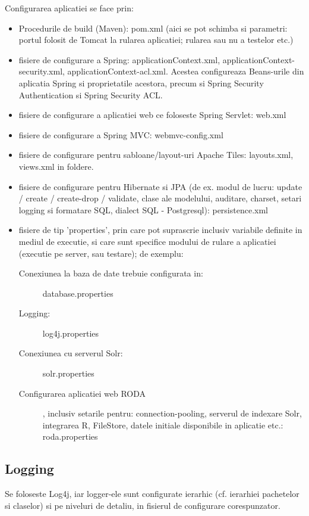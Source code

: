 Configurarea aplicatiei se face prin:
\begin {itemize}
\item Procedurile de build (Maven):
pom.xml
(aici se pot schimba si parametri: portul folosit de Tomcat la rularea aplicatiei; rularea sau nu a testelor etc.)
\item
fisiere de configurare a Spring: applicationContext.xml,
applicationContext-security.xml, applicationContext-acl.xml. 
Acestea configureaza Beans-urile din aplicatia Spring si proprietatile acestora, precum si Spring Security Authentication si Spring Security ACL.
\item
fisiere de configurare a aplicatiei web ce foloseste Spring Servlet:
web.xml
\item
fisiere de configurare a Spring MVC: 
webmvc-config.xml
\item
fisiere de configurare pentru sabloane/layout-uri Apache Tiles: 
layouts.xml, views.xml in foldere.
\item 
fisiere de configurare pentru Hibernate si JPA (de ex. modul de lucru: update / create / create-drop /
validate, clase ale modelului, auditare, charset, setari logging si formatare SQL, dialect SQL - Postgresql):
persistence.xml
\item
fisiere de tip 'properties', prin care pot suprascrie
inclusiv variabile definite in mediul de executie, si care sunt specifice modului de rulare a
aplicatiei (executie pe server, sau testare); de exemplu: 
\begin{description}
\item[Conexiunea la baza de date trebuie configurata in:]
database.properties
\item[Logging:]
log4j.properties
\item[Conexiunea cu serverul Solr:]
solr.properties
\item[Configurarea aplicatiei web RODA], inclusiv setarile pentru: connection-pooling, serverul de indexare
Solr, integrarea R, FileStore, datele initiale disponibile in aplicatie etc.:
roda.properties
\end{description}
\end{itemize}

\subsection{Logging}
Se foloseste Log4j, iar logger-ele sunt configurate ierarhic (cf. ierarhiei
pachetelor si claselor) si pe niveluri de detaliu, in fisierul de
configurare corespunzator.

